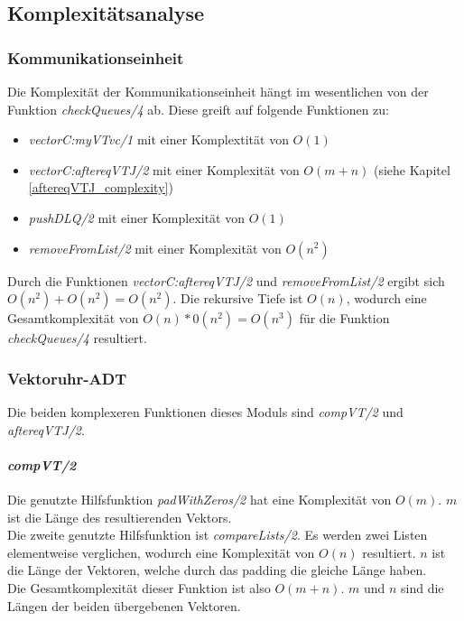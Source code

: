 \subsection{Komplexitätsanalyse}

\subsubsection{Kommunikationseinheit}

Die Komplexität der Kommunikationseinheit hängt im wesentlichen von der Funktion \textit{checkQueues/4} ab. Diese greift auf folgende Funktionen zu:
\begin{itemize}
    \item \textit{vectorC:myVTvc/1} mit einer Komplextität von $O(1)$
    \item \textit{vectorC:aftereqVTJ/2} mit einer Komplexität von $O(m+n)$ (siehe Kapitel \ref{aftereqVTJ_complexity})
    \item \textit{pushDLQ/2} mit einer Komplexität von $O(1)$
    \item \textit{removeFromList/2} mit einer Komplexität von $O(n^2)$
\end{itemize}

Durch die Funktionen \textit{vectorC:aftereqVTJ/2} und \textit{removeFromList/2} ergibt sich $O(n^2)+O(n^2)=O(n^2)$. Die rekursive Tiefe ist $O(n)$, wodurch eine Gesamtkomplexität von $O(n)*0(n^2)=O(n^3)$ für die Funktion \textit{checkQueues/4} resultiert.

\subsubsection{Vektoruhr-ADT}

Die beiden komplexeren Funktionen dieses Moduls sind \textit{compVT/2} und \textit{aftereqVTJ/2}. 

\paragraph{\textit{compVT/2}}

Die genutzte Hilfsfunktion \textit{padWithZeros/2} hat eine Komplexität von $O(m)$. $m$ ist die Länge des resultierenden Vektors.\\
Die zweite genutzte Hilfsfunktion ist \textit{compareLists/2}. Es werden zwei Listen elementweise verglichen, wodurch eine Komplexität von $O(n)$ resultiert. $n$ ist die Länge der Vektoren, welche durch das padding die gleiche Länge haben.\\
Die Gesamtkomplexität dieser Funktion ist also $O(m+n)$. $m$ und $n$ sind die Längen der beiden übergebenen Vektoren.

